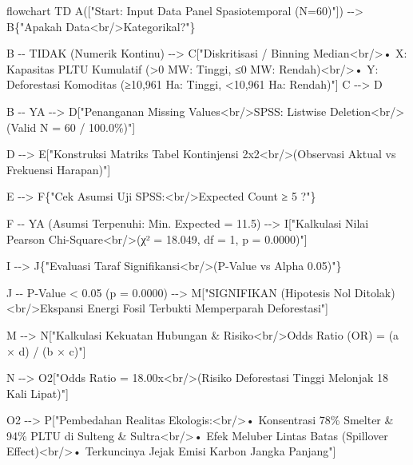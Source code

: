 \documentclass[
]{article}
\newenvironment{Shaded}{}{}
\newcommand{\NormalTok}[1]{#1}
\begin{document}
\begin{Shaded}
\begin{Highlighting}[]
\NormalTok{flowchart TD}
\NormalTok{    A(["Start: Input Data Panel Spasiotemporal (N=60)"]) {-}{-}\textgreater{} B\{"Apakah Data\textless{}br/\textgreater{}Kategorikal?"\}}
    
\NormalTok{    B {-}{-} TIDAK (Numerik Kontinu) {-}{-}\textgreater{} C["Diskritisasi / Binning Median\textless{}br/\textgreater{}• X: Kapasitas PLTU Kumulatif (\textgreater{}0 MW: Tinggi, ≤0 MW: Rendah)\textless{}br/\textgreater{}• Y: Deforestasi Komoditas (≥10,961 Ha: Tinggi, \textless{}10,961 Ha: Rendah)"]}
\NormalTok{    C {-}{-}\textgreater{} D}
    
\NormalTok{    B {-}{-} YA {-}{-}\textgreater{} D["Penanganan Missing Values\textless{}br/\textgreater{}SPSS: Listwise Deletion\textless{}br/\textgreater{}(Valid N = 60 / 100.0\%)"]}
    
\NormalTok{    D {-}{-}\textgreater{} E["Konstruksi Matriks Tabel Kontinjensi 2x2\textless{}br/\textgreater{}(Observasi Aktual vs Frekuensi Harapan)"]}
    
\NormalTok{    E {-}{-}\textgreater{} F\{"Cek Asumsi Uji SPSS:\textless{}br/\textgreater{}Expected Count ≥ 5 ?"\}}
    
\NormalTok{    F {-}{-} YA (Asumsi Terpenuhi: Min. Expected = 11.5) {-}{-}\textgreater{} I["Kalkulasi Nilai Pearson Chi{-}Square\textless{}br/\textgreater{}(χ² = 18.049, df = 1, p = 0.0000)"]}
    
\NormalTok{    I {-}{-}\textgreater{} J\{"Evaluasi Taraf Signifikansi\textless{}br/\textgreater{}(P{-}Value vs Alpha 0.05)"\}}
    
\NormalTok{    J {-}{-} P{-}Value \textless{} 0.05 (p = 0.0000) {-}{-}\textgreater{} M["SIGNIFIKAN (Hipotesis Nol Ditolak)\textless{}br/\textgreater{}Ekspansi Energi Fosil Terbukti Memperparah Deforestasi"]}
    
\NormalTok{    M {-}{-}\textgreater{} N["Kalkulasi Kekuatan Hubungan \& Risiko\textless{}br/\textgreater{}Odds Ratio (OR) = (a × d) / (b × c)"]}
    
\NormalTok{    N {-}{-}\textgreater{} O2["Odds Ratio = 18.00x\textless{}br/\textgreater{}(Risiko Deforestasi Tinggi Melonjak 18 Kali Lipat)"]}
    
\NormalTok{    O2 {-}{-}\textgreater{} P["Pembedahan Realitas Ekologis:\textless{}br/\textgreater{}• Konsentrasi 78\% Smelter \& 94\% PLTU di Sulteng \& Sultra\textless{}br/\textgreater{}• Efek Meluber Lintas Batas (Spillover Effect)\textless{}br/\textgreater{}• Terkuncinya Jejak Emisi Karbon Jangka Panjang"]}
    

\end{Highlighting}
\end{Shaded}
\end{document}
